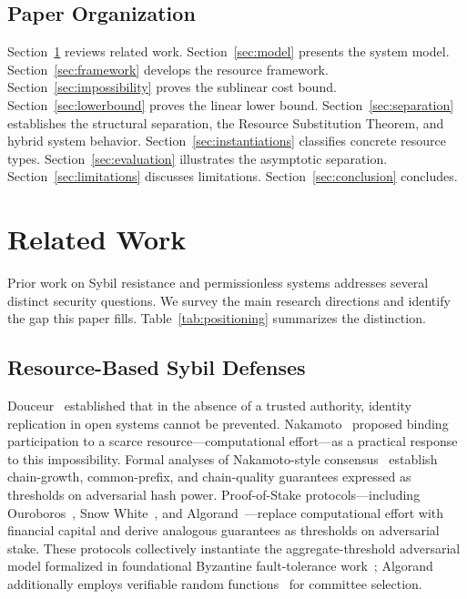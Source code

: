 \documentclass[manuscript,review]{acmart}
\theoremstyle{remark}
\begin{document}
	
	
	\subsection{Paper Organization}
	\label{ssec:organization}
	
	Section~\ref{sec:related} reviews related work.
	Section~\ref{sec:model} presents the system model.
	Section~\ref{sec:framework} develops the resource framework.
	Section~\ref{sec:impossibility} proves the sublinear cost bound.
	Section~\ref{sec:lowerbound} proves the linear lower bound.
	Section~\ref{sec:separation} establishes the structural
	separation, the Resource Substitution Theorem,
	and hybrid system behavior.
	Section~\ref{sec:instantiations} classifies concrete resource types.
	Section~\ref{sec:evaluation} illustrates the asymptotic separation.
	Section~\ref{sec:limitations} discusses limitations.
	Section~\ref{sec:conclusion} concludes.
	
	\section{Related Work}
	\label{sec:related}
	
	Prior work on Sybil resistance and permissionless systems
	addresses several distinct security questions.
	We survey the main research directions and identify
	the gap this paper fills.
	Table~\ref{tab:positioning} summarizes the distinction.
	
	\subsection{Resource-Based Sybil Defenses}
	\label{ssec:rw_resource}
	
	Douceur~\cite{douceur2002sybil} established that in the
	absence of a trusted authority, identity replication in
	open systems cannot be prevented.
	Nakamoto~\cite{nakamoto2008bitcoin} proposed binding
	participation to a scarce resource---computational
	effort---as a practical response to this impossibility.
	Formal analyses of Nakamoto-style
	consensus~\cite{garay2015backbone,ren2019nakamoto,pass2017hybrid,pass2017fruitchains}
	establish chain-growth, common-prefix, and chain-quality
	guarantees expressed as thresholds on adversarial hash power.
	Proof-of-Stake protocols---including
	Ouroboros~\cite{kiayias2017ouroboros,kiayias2018ouroboros,kiayias2020genesis},
	Snow White~\cite{pass2016snowwhite},
	and Algorand~\cite{gilad2017algorand}---replace
	computational effort with financial capital and derive
	analogous guarantees as thresholds on adversarial stake.
	These protocols collectively instantiate the
	aggregate-threshold adversarial model formalized in
	foundational Byzantine fault-tolerance
	work~\cite{lamport1982byzantine,castro1999pbft};
	Algorand additionally employs verifiable random
	functions~\cite{micali1999vrf} for committee selection.
	
\end{document}
